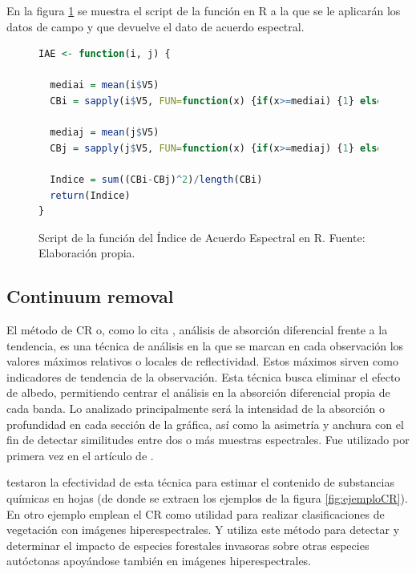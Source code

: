 En la figura \ref{fig:IAE} se muestra el script de la función en R a la que se le aplicarán los datos de campo y que devuelve el dato de acuerdo espectral.

\begin{figure}
\centering
\begin{lstlisting}[language = R, frame = single]
  IAE <- function(i, j) {
  
  mediai = mean(i$V5)
  CBi = sapply(i$V5, FUN=function(x) {if(x>=mediai) {1} else {0}})
  
  mediaj = mean(j$V5)
  CBj = sapply(j$V5, FUN=function(x) {if(x>=mediaj) {1} else {0}})
  	
  Indice = sum((CBi-CBj)^2)/length(CBi)
  return(Indice)  
}
\end{lstlisting}
\caption[Función de Índice de Acuerdo Espectral]{Script de la función del Índice de Acuerdo Espectral en R. Fuente: Elaboración propia.}
\label{fig:IAE}
\end{figure}

\subsection{Continuum removal}
\label{subsec:Continuum_removal}

El método de \ac{CR} o, como lo cita \cite{chuvieco2002teledeteccion}, análisis de absorción diferencial frente a la tendencia, es una técnica de análisis en la que se marcan en cada observación los valores máximos relativos o locales de reflectividad. Estos máximos sirven como indicadores de tendencia de la observación. Esta técnica busca eliminar el efecto de albedo, permitiendo centrar el análisis en la absorción diferencial propia de cada banda. Lo analizado principalmente será la intensidad de la absorción o profundidad en cada sección de la gráfica, así como la asimetría y anchura con el fin de detectar similitudes entre dos o más muestras espectrales. Fue utilizado por primera vez en el artículo de \cite{kokaly1999spectroscopic}.\Sep

\cite{huang2004estimating} testaron la efectividad de esta técnica para estimar el contenido de substancias químicas en hojas (de donde se extraen los ejemplos de la figura \ref{fig:ejemploCR}). En otro ejemplo \cite{filippi2007effect} emplean el \ac{CR} como utilidad para realizar clasificaciones de vegetación con imágenes hiperespectrales. Y \cite{underwood2003mapping} utiliza este método para detectar y determinar el impacto de especies forestales invasoras sobre otras especies autóctonas apoyándose también en imágenes hiperespectrales.\Sep

